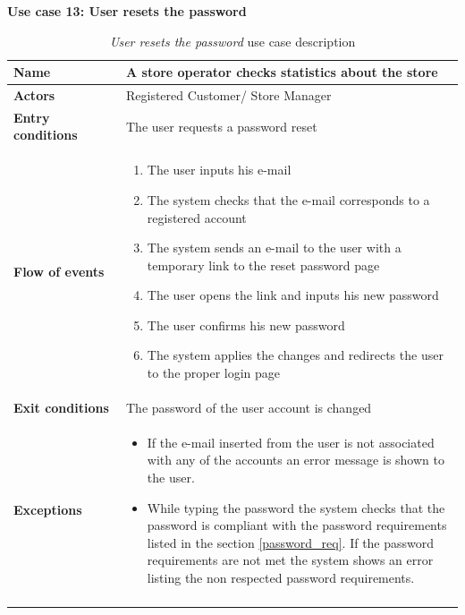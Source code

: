 \clearpage
\textbf{Use case 13: User resets the password}
\smallskip
{}
\begin{longtable}{p{0.25\linewidth}p{0.75\linewidth}}
    \toprule
    \textbf{Name}             & \textbf{A store operator checks statistics about the store}                                        \\
    \midrule
    \textbf{Actors}           & Registered Customer/ Store Manager                                                                      \\
    \midrule
    \textbf{Entry conditions} & The user  requests a password reset                                 \\
    \midrule
    \textbf{Flow of events}   &
    \begin{enumerate}
        \item The user inputs his e-mail
        \item The system checks that the e-mail corresponds to a registered account
        \item The system sends an e-mail to the user with a temporary link to the reset password page
        \item The user opens the link and inputs his new password 
        \item The user confirms his new password
        \item The system applies the changes and redirects the user to the proper login page
    \end{enumerate}                                                                                                     \\
    \midrule
    \textbf{Exit conditions}  & The password of the user account is changed                                 \\
    \midrule
    \textbf{Exceptions}       & 
    \begin{itemize}
        \item If the e-mail inserted from the user is not associated with any of the accounts an error message is shown to the user.
        \item While typing the password the system checks that the password is compliant with the password requirements listed in the section \ref{password_req}. If the password requirements are not met the system shows an error listing the non respected password requirements.
    \end{itemize}\\
    \bottomrule
    \caption{\emph{User resets the password} use case description}
\end{longtable}
\clearpage

